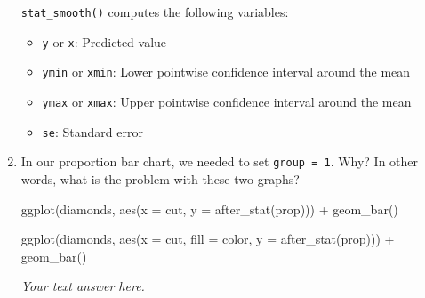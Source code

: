 \documentclass[
  letterpaper,
  DIV=11,
  numbers=noendperiod]{scrreprt}
\newenvironment{Shaded}{\begin{snugshade}}{\end{snugshade}}
\newcommand{\AttributeTok}[1]{\textcolor[rgb]{0.40,0.45,0.13}{#1}}
\newcommand{\FunctionTok}[1]{\textcolor[rgb]{0.28,0.35,0.67}{#1}}
\newcommand{\NormalTok}[1]{\textcolor[rgb]{0.00,0.23,0.31}{#1}}
\newcommand{\SpecialCharTok}[1]{\textcolor[rgb]{0.37,0.37,0.37}{#1}}
\providecommand{\tightlist}{%
  \setlength{\itemsep}{0pt}\setlength{\parskip}{0pt}}\usepackage{longtable,booktabs,array}
\begin{document}
\begin{enumerate}
\begin{tcolorbox}
  \texttt{stat\_smooth()} computes the following variables:

  \begin{itemize}
  \tightlist
  \item
    \texttt{y} or \texttt{x}: Predicted value
  \item
    \texttt{ymin} or \texttt{xmin}: Lower pointwise confidence interval
    around the mean
  \item
    \texttt{ymax} or \texttt{xmax}: Upper pointwise confidence interval
    around the mean
  \item
    \texttt{se}: Standard error
  \end{itemize}

  \end{tcolorbox}
\item
  In our proportion bar chart, we needed to set \texttt{group\ =\ 1}.
  Why? In other words, what is the problem with these two graphs?

\begin{Shaded}
\begin{Highlighting}[]
\FunctionTok{ggplot}\NormalTok{(diamonds, }\FunctionTok{aes}\NormalTok{(}\AttributeTok{x =}\NormalTok{ cut, }\AttributeTok{y =} \FunctionTok{after\_stat}\NormalTok{(prop))) }\SpecialCharTok{+} 
  \FunctionTok{geom\_bar}\NormalTok{()}
\end{Highlighting}
\end{Shaded}

\begin{Shaded}
\begin{Highlighting}[]
\FunctionTok{ggplot}\NormalTok{(diamonds, }\FunctionTok{aes}\NormalTok{(}\AttributeTok{x =}\NormalTok{ cut, }\AttributeTok{fill =}\NormalTok{ color, }\AttributeTok{y =} \FunctionTok{after\_stat}\NormalTok{(prop))) }\SpecialCharTok{+} 
  \FunctionTok{geom\_bar}\NormalTok{()}
\end{Highlighting}
\end{Shaded}

  \begin{tcolorbox}[enhanced jigsaw, breakable, bottomtitle=1mm, left=2mm, colback=white, toprule=.15mm, leftrule=.75mm, colframe=quarto-callout-note-color-frame, colbacktitle=quarto-callout-note-color!10!white, title={Answer}, coltitle=black, toptitle=1mm, bottomrule=.15mm, opacitybacktitle=0.6, arc=.35mm, rightrule=.15mm, titlerule=0mm, opacityback=0]

  \emph{Your text answer here.}

  \end{tcolorbox}


\end{enumerate}
\end{document}
